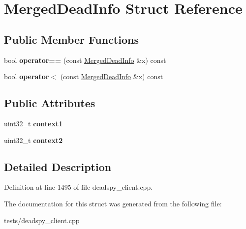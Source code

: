 \hypertarget{structMergedDeadInfo}{\section{Merged\-Dead\-Info Struct Reference}
\label{structMergedDeadInfo}
}
\subsection*{Public Member Functions}
\begin{DoxyCompactItemize}
\item 
\hypertarget{structMergedDeadInfo_a203747796d18a927e0c999c15514eaec}{bool {\bfseries operator==} (const \hyperlink{structMergedDeadInfo}{Merged\-Dead\-Info} \&x) const }\label{structMergedDeadInfo_a203747796d18a927e0c999c15514eaec}

\item 
\hypertarget{structMergedDeadInfo_ab0303265881085b42863fe2befde8f30}{bool {\bfseries operator$<$} (const \hyperlink{structMergedDeadInfo}{Merged\-Dead\-Info} \&x) const }\label{structMergedDeadInfo_ab0303265881085b42863fe2befde8f30}

\end{DoxyCompactItemize}
\subsection*{Public Attributes}
\begin{DoxyCompactItemize}
\item 
\hypertarget{structMergedDeadInfo_ade00177eb7fde9ee410b54b9f6dd064b}{uint32\-\_\-t {\bfseries context1}}\label{structMergedDeadInfo_ade00177eb7fde9ee410b54b9f6dd064b}

\item 
\hypertarget{structMergedDeadInfo_a2cedd6ef1c9a57eb032cc8d85f60cd71}{uint32\-\_\-t {\bfseries context2}}\label{structMergedDeadInfo_a2cedd6ef1c9a57eb032cc8d85f60cd71}

\end{DoxyCompactItemize}


\subsection{Detailed Description}


Definition at line 1495 of file deadspy\-\_\-client.\-cpp.



The documentation for this struct was generated from the following file\-:\begin{DoxyCompactItemize}
\item 
tests/deadspy\-\_\-client.\-cpp\end{DoxyCompactItemize}

